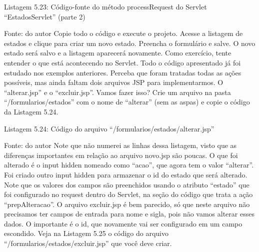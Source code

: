 Listagem 5.23: Código-fonte do método processRequest do Servlet ``EstadosServlet'' (parte 2)
 
Fonte: do autor
Copie todo o código e execute o projeto. Acesse a listagem de estados e clique para criar um novo estado. Preencha o formulário e salve. O novo estado será salvo e a listagem aparecerá novamente. Como exercício, tente entender o que está acontecendo no Servlet. Todo o código apresentado já foi estudado nos exemplos anteriores. Perceba que foram tratadas todas as ações possíveis, mas ainda faltam dois arquivos JSP para implementarmos. O ``alterar.jsp'' e o ``excluir.jsp''. Vamos fazer isso? Crie um arquivo na pasta ``/formularios/estados'' com o nome de ``alterar'' (sem as aspas) e copie o código da Listagem 5.24.

























Listagem 5.24: Código do arquivo ``/formularios/estados/alterar.jsp''
 
Fonte: do autor
Note que não numerei as linhas dessa listagem, visto que as diferenças importantes em relação ao arquivo novo.jsp são poucas. O que foi alterado é o input hidden nomeado como ``acao'', que agora tem o valor ``alterar''. Foi criado outro input hidden para armazenar o id do estado que será alterado. Note que os valores dos campos são preenchidos usando o atributo ``estado'' que foi configurado no request dentro do Servlet, na seção do código que trata a ação ``prepAlteracao''.
O arquivo excluir.jsp é bem parecido, só que neste arquivo não precisamos ter campos de entrada para nome e sigla, pois não vamos alterar esses dados. O importante é o id, que novamente vai ser configurado em um campo escondido. Veja na Listagem 5.25 o código do arquivo ``/formularios/estados/excluir.jsp'' que você deve criar.




















